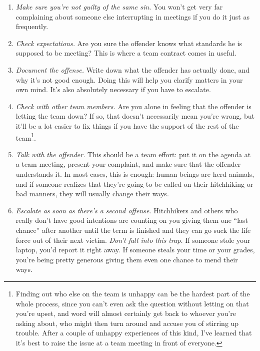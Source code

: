\documentclass{report}
\begin{document}
\begin{enumerate}

  \item \emph{Make sure you're not guilty of the same sin.} You won't
  get very far complaining about someone else interrupting in meetings
  if you do it just as frequently.

  \item \emph{Check expectations.} Are you sure the offender knows
  what standards he is supposed to be meeting?  This is where a team
  contract comes in useful.

  \item \emph{Document the offense.} Write down what the offender has
  actually done, and why it's not good enough.  Doing this will help
  you clarify matters in your own mind.  It's also absolutely
  necessary if you have to escalate.

  \item \emph{Check with other team members.} Are you alone in feeling
  that the offender is letting the team down?  If so, that doesn't
  necessarily mean you're wrong, but it'll be a lot easier to fix
  things if you have the support of the rest of the
  team\footnote{Finding out who else on the team is unhappy can be the
  hardest part of the whole process, since you can't even ask the
  question without letting on that you're upset, and word will almost
  certainly get back to whoever you're asking about, who might then
  turn around and accuse you of stirring up trouble.  After a couple
  of unhappy experiences of this kind, I've learned that it's best to
  raise the issue at a team meeting in front of everyone.}.

  \item \emph{Talk with the offender.} This should be a team effort:
  put it on the agenda at a team meeting, present your complaint, and
  make sure that the offender understands it.  In most cases, this is
  enough: human beings are herd animals, and if someone realizes that
  they're going to be called on their hitchhiking or bad manners, they
  will usually change their ways.

  \item \emph{Escalate as soon as there's a second offense.}
  Hitchhikers and others who really don't have good intentions are
  counting on you giving them one ``last chance'' after another until
  the term is finished and they can go suck the life force out of
  their next victim.  \emph{Don't fall into this trap.}  If someone
  stole your laptop, you'd report it right away.  If someone steals
  your time or your grades, you're being pretty generous giving them
  even one chance to mend their ways.

\end{enumerate}
\end{document}
